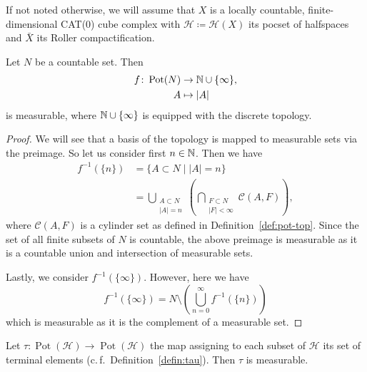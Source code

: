 If not noted otherwise, we will assume that \(X\) is a locally countable, finite-dimensional CAT(0) cube complex with \(\mathcal{H} \coloneqq \mathcal{H}(X)\) its pocset of halfspaces and \(\bar X\) its Roller compactification.

\begin{lemma}
  \label{lem:measurable-countable}
  Let \(N\) be a countable set. Then
  \begin{align*}
    f\colon \operatorname{Pot}(N) &\to \mathbb{N} \cup \{\infty\},\\
    A &\mapsto |A|
  \end{align*}
  is measurable, where \(\mathbb{N} \cup \{\infty\}\) is equipped with the discrete topology.
\end{lemma}

\begin{proof}
  We will see that a basis of the topology is mapped to measurable sets via the preimage. So let us consider first \(n \in \mathbb{N}\). Then we have
  \begin{align*}
    f^{-1}(\{n\})
    & = \{ A \subset N \mid |A| = n\}\\
    & = \bigcup_{\substack{A \subset N\\|A| = n}} \left ( \bigcap_{\substack{F \subset N\\|F|< \infty}}\mathcal{C}(A,F)\right),
  \end{align*}
  where \(\mathcal{C}(A,F)\) is a cylinder set as defined in Definition~\ref{def:pot-top}. Since the set of all finite subsets of \(N\) is countable, the above preimage is measurable as it is a countable union and intersection of measurable sets.

  Lastly, we consider \(f^{-1}(\{\infty\})\). However, here we have
  \[
    f^{-1}(\{\infty\}) = N \setminus \left (\bigcup_{n=0}^\infty f^{-1}(\{n\})\right)
  \]
  which is measurable as it is the complement of a measurable set.
\end{proof}

\begin{lemma}
  \label{lem:tau}
   Let \(\tau\colon \operatorname{Pot}(\mathcal{H}) \to \operatorname{Pot}(\mathcal{H})\) the map assigning to each subset of \(\mathcal{H}\) its set of terminal elements (c.\,f.~Definition~\ref{defin:tau}). Then \(\tau\) is measurable.
\end{lemma}

